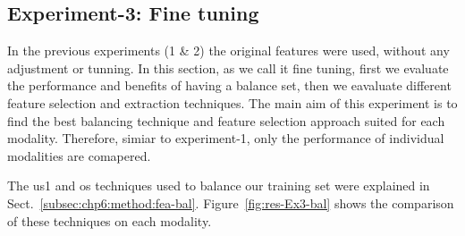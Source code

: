 \subsection{Experiment-3: Fine tuning}\label{subsec:chp6:exp-res:Ex3}
In the previous experiments (1 \& 2) the original features were used, without any adjustment or tunning. 
In this section, as we call it fine tuning, first we evaluate the performance and benefits of having a balance set, then we eavaluate different feature selection and extraction techniques.
The main aim of this experiment is to find the best balancing technique and feature selection approach suited for each modality. 
Therefore, simiar to experiment-1, only the performance of individual modalities are comapered. 

The \ac{us1} and \ac{os} techniques used to balance our training set were explained in Sect.~\ref{subsec:chp6:method:fea-bal}.
Figure~\ref{fig:res-Ex3-bal} shows the comparison of these techniques on each modality. 
